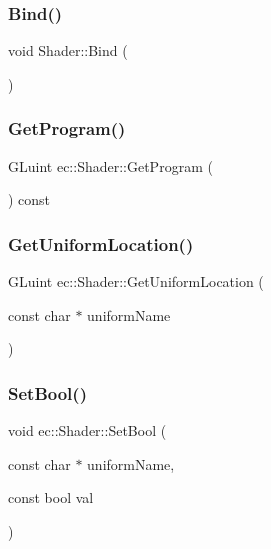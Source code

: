 \subsubsection{\texorpdfstring{Bind()}{Bind()}}
{\footnotesize\ttfamily void Shader\+::\+Bind (\begin{DoxyParamCaption}{ }\end{DoxyParamCaption})}

\mbox{\label{classec_1_1_shader_a18c240d6a743d11d75973edc8cd05e82}} 
\subsubsection{\texorpdfstring{Get\+Program()}{GetProgram()}}
{\footnotesize\ttfamily G\+Luint ec\+::\+Shader\+::\+Get\+Program (\begin{DoxyParamCaption}{ }\end{DoxyParamCaption}) const}

\mbox{\label{classec_1_1_shader_a643768533d2d2cf6ea5b10fcce8da680}} 
\subsubsection{\texorpdfstring{Get\+Uniform\+Location()}{GetUniformLocation()}}
{\footnotesize\ttfamily G\+Luint ec\+::\+Shader\+::\+Get\+Uniform\+Location (\begin{DoxyParamCaption}\item[{const char $\ast$}]{uniform\+Name }\end{DoxyParamCaption})}

\mbox{\label{classec_1_1_shader_a17cf7b3816cdc8c41ccefda08294e20e}} 
\subsubsection{\texorpdfstring{Set\+Bool()}{SetBool()}}
{\footnotesize\ttfamily void ec\+::\+Shader\+::\+Set\+Bool (\begin{DoxyParamCaption}\item[{const char $\ast$}]{uniform\+Name,  }\item[{const bool}]{val }\end{DoxyParamCaption})}

